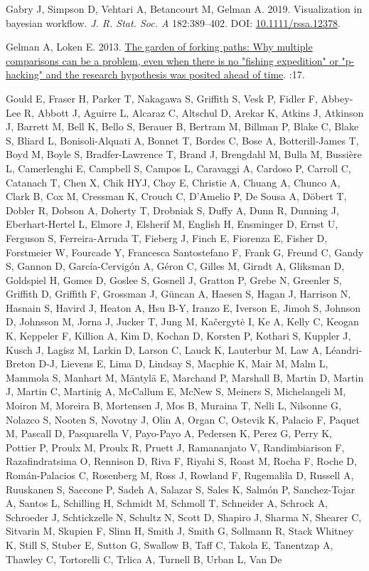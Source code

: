 \documentclass[10pt,a4paper]{article}
\newlength{\cslhangindent}
\newenvironment{CSLReferences}[2] %
 {\begin{list}{}{%
  \setlength{\itemindent}{0pt}
  \setlength{\leftmargin}{0pt}
  \setlength{\parsep}{0pt}
  \ifodd #1
   \setlength{\leftmargin}{\cslhangindent}
   \setlength{\itemindent}{-1\cslhangindent}
  \fi
  \setlength{\itemsep}{#2\baselineskip}}}
 {\end{list}}
\begin{document}
\begin{CSLReferences}{1}{0}
Gabry J, Simpson D, Vehtari A, Betancourt M, Gelman A. 2019. Visualization in bayesian workflow. \emph{J. R. Stat. Soc. A} 182:389--402. DOI: \href{https://doi.org/10.1111/rssa.12378}{10.1111/rssa.12378}.

Gelman A, Loken E. 2013. \href{http://www.stat.columbia.edu/~gelman/research/unpublished/p_hacking.pdf}{The garden of forking paths: {Why} multiple comparisons can be a problem, even when there is no "fishing expedition" or "p-hacking" and the research hypothesis was posited ahead of time}. :17.

Gould E, Fraser H, Parker T, Nakagawa S, Griffith S, Vesk P, Fidler F, Abbey-Lee R, Abbott J, Aguirre L, Alcaraz C, Altschul D, Arekar K, Atkins J, Atkinson J, Barrett M, Bell K, Bello S, Berauer B, Bertram M, Billman P, Blake C, Blake S, Bliard L, Bonisoli-Alquati A, Bonnet T, Bordes C, Bose A, Botterill-James T, Boyd M, Boyle S, Bradfer-Lawrence T, Brand J, Brengdahl M, Bulla M, Bussière L, Camerlenghi E, Campbell S, Campos L, Caravaggi A, Cardoso P, Carroll C, Catanach T, Chen X, Chik HYJ, Choy E, Christie A, Chuang A, Chunco A, Clark B, Cox M, Cressman K, Crouch C, D'Amelio P, De Sousa A, Döbert T, Dobler R, Dobson A, Doherty T, Drobniak S, Duffy A, Dunn R, Dunning J, Eberhart-Hertel L, Elmore J, Elsherif M, English H, Ensminger D, Ernst U, Ferguson S, Ferreira-Arruda T, Fieberg J, Finch E, Fiorenza E, Fisher D, Forstmeier W, Fourcade Y, Francesca Santostefano F, Frank G, Freund C, Gandy S, Gannon D, García-Cervigón A, Géron C, Gilles M, Girndt A, Gliksman D, Goldspiel H, Gomes D, Goslee S, Gosnell J, Gratton P, Grebe N, Greenler S, Griffith D, Griffith F, Grossman J, Güncan A, Haesen S, Hagan J, Harrison N, Hasnain S, Havird J, Heaton A, Hsu B-Y, Iranzo E, Iverson E, Jimoh S, Johnson D, Johnsson M, Jorna J, Jucker T, Jung M, Kačergytė I, Ke A, Kelly C, Keogan K, Keppeler F, Killion A, Kim D, Kochan D, Korsten P, Kothari S, Kuppler J, Kusch J, Lagisz M, Larkin D, Larson C, Lauck K, Lauterbur M, Law A, Léandri-Breton D-J, Lievens E, Lima D, Lindsay S, Macphie K, Mair M, Malm L, Mammola S, Manhart M, Mäntylä E, Marchand P, Marshall B, Martin D, Martin J, Martin C, Martinig A, McCallum E, McNew S, Meiners S, Michelangeli M, Moiron M, Moreira B, Mortensen J, Mos B, Muraina T, Nelli L, Nilsonne G, Nolazco S, Nooten S, Novotny J, Olin A, Organ C, Ostevik K, Palacio F, Paquet M, Pascall D, Pasquarella V, Payo-Payo A, Pedersen K, Perez G, Perry K, Pottier P, Proulx M, Proulx R, Pruett J, Ramananjato V, Randimbiarison F, Razafindratsima O, Rennison D, Riva F, Riyahi S, Roast M, Rocha F, Roche D, Román-Palacios C, Rosenberg M, Ross J, Rowland F, Rugemalila D, Russell A, Ruuskanen S, Saccone P, Sadeh A, Salazar S, Sales K, Salmón P, Sanchez-Tojar A, Santos L, Schilling H, Schmidt M, Schmoll T, Schneider A, Schrock A, Schroeder J, Schtickzelle N, Schultz N, Scott D, Shapiro J, Sharma N, Shearer C, Sitvarin M, Skupien F, Slinn H, Smith J, Smith G, Sollmann R, Stack Whitney K, Still S, Stuber E, Sutton G, Swallow B, Taff C, Takola E, Tanentzap A, Thawley C, Tortorelli C, Trlica A, Turnell B, Urban L, Van De 
\end{CSLReferences}
\end{document}
